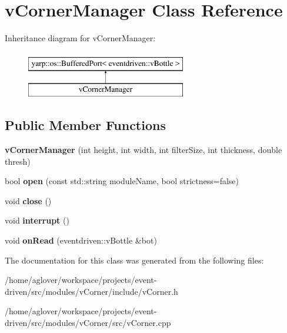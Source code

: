 \hypertarget{classvCornerManager}{}\section{v\+Corner\+Manager Class Reference}
\label{classvCornerManager}
Inheritance diagram for v\+Corner\+Manager\+:\begin{figure}[H]
\begin{center}
\leavevmode
\includegraphics[height=2.000000cm]{classvCornerManager}
\end{center}
\end{figure}
\subsection*{Public Member Functions}
\begin{DoxyCompactItemize}
\item 
{\bfseries v\+Corner\+Manager} (int height, int width, int filter\+Size, int thickness, double thresh)\hypertarget{classvCornerManager_a767e4a3bac4f9c20da2da54eef8a12f3}{}\label{classvCornerManager_a767e4a3bac4f9c20da2da54eef8a12f3}

\item 
bool {\bfseries open} (const std\+::string module\+Name, bool strictness=false)\hypertarget{classvCornerManager_ae87a3b35a1047404536af869dd837621}{}\label{classvCornerManager_ae87a3b35a1047404536af869dd837621}

\item 
void {\bfseries close} ()\hypertarget{classvCornerManager_acf1440f33d67878234673e9d4d65a5bf}{}\label{classvCornerManager_acf1440f33d67878234673e9d4d65a5bf}

\item 
void {\bfseries interrupt} ()\hypertarget{classvCornerManager_a360ad86c3e051d7f452bdb4c8d82b28d}{}\label{classvCornerManager_a360ad86c3e051d7f452bdb4c8d82b28d}

\item 
void {\bfseries on\+Read} (eventdriven\+::v\+Bottle \&bot)\hypertarget{classvCornerManager_aa7d750d2fbc1b09ff705ec5b27018cee}{}\label{classvCornerManager_aa7d750d2fbc1b09ff705ec5b27018cee}

\end{DoxyCompactItemize}


The documentation for this class was generated from the following files\+:\begin{DoxyCompactItemize}
\item 
/home/aglover/workspace/projects/event-\/driven/src/modules/v\+Corner/include/v\+Corner.\+h\item 
/home/aglover/workspace/projects/event-\/driven/src/modules/v\+Corner/src/v\+Corner.\+cpp\end{DoxyCompactItemize}
